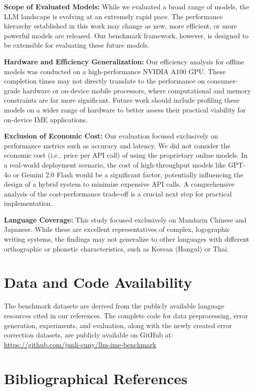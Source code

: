 \documentclass[10pt, a4paper]{article}
\begin{document}
\textbf{Scope of Evaluated Models:} While we evaluated a broad range of models, the LLM landscape is evolving at an extremely rapid pace. The performance hierarchy established in this work may change as new, more efficient, or more powerful models are released. Our benchmark framework, however, is designed to be extensible for evaluating these future models.

\textbf{Hardware and Efficiency Generalization:} Our efficiency analysis for offline models was conducted on a high-performance NVIDIA A100 GPU. These completion times may not directly translate to the performance on consumer-grade hardware or on-device mobile processors, where computational and memory constraints are far more significant. Future work should include profiling these models on a wider range of hardware to better assess their practical viability for on-device IME applications.

\textbf{Exclusion of Economic Cost:} Our evaluation focused exclusively on performance metrics such as accuracy and latency. We did not consider the economic cost ({i.e.}, price per API call) of using the proprietary online models. In a real-world deployment scenario, the cost of high-throughput models like GPT-4o or Gemini 2.0 Flash would be a significant factor, potentially influencing the design of a hybrid system to minimize expensive API calls. A comprehensive analysis of the cost-performance trade-off is a crucial next step for practical implementation.

\textbf{Language Coverage:} This study focused exclusively on Mandarin Chinese and Japanese. While these are excellent representatives of complex, logographic writing systems, the findings may not generalize to other languages with different orthographic or phonetic characteristics, such as Korean (Hangul) or Thai.


\section{Data and Code Availability}

The benchmark datasets are derived from the publicly available language resources cited in our references. The complete code for data preprocessing, error generation, experiments, and evaluation, along with the newly created error correction datasets, are publicly available on GitHub at: \url{https://github.com/junli-cuny/llm-ime-benchmark}


\section{Bibliographical References}
\vspace{-1em}
\label{sec:reference}


\end{document}
